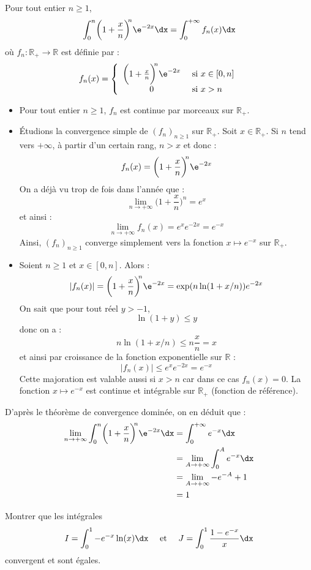 \documentclass[a4paper,10pt]{report}
\begin{document}
\corr Pour tout entier $n \geq 1$,
$$ \int_{0}^{n} \biggl( 1 + \frac{x}{n} \biggr)^{\!\!n} \e^{ - 2x} \dx = \int_0^{+ \infty} f_n(x) \dx$$
où $f_n : \mathbb{R}_+ \rightarrow  \mathbb{R}$ est définie par :
$$ f_n(x) = \left\lbrace \begin{array}{cl}
\biggl( 1 + \frac{x}{n} \biggr)^{\!\!n} \e^{ - 2x} & \hbox{ si } x \in [0,n] \\
0 & \hbox{ si } x>n
\end{array}\right.$$
\begin{itemize}
\item Pour tout entier $n \geq 1$, $f_n$ est continue par morceaux sur $\mathbb{R}_+$.
\item Étudions la convergence simple de $(f_n)_{n \geq 1}$ sur $\mathbb{R}_+$. Soit $x \in \mathbb{R}_+$. Si $n$ tend vers $+ \infty$, à partir d'un certain rang, $n>x$ et donc :
$$ f_n(x) = \biggl( 1 + \frac{x}{n} \biggr)^{\!\!n} \e^{ - 2x}$$
On a déjà vu trop de fois dans l'année que :
$$ \lim_{n \rightarrow + \infty} \biggl( 1 + \frac{x}{n} \biggr)^{\!\!n} = e^x$$
et ainsi :
$$ \lim_{n \rightarrow + \infty} f_n(x) =e^x e^{-2x} = e^{-x}$$
Ainsi, $(f_n)_{n \geq 1}$ converge simplement vers la fonction $x \mapsto e^{-x}$ sur $\mathbb{R}_+$.
\item Soient $n \geq 1$ et $x \in [0,n]$. Alors :
$$ \vert f_n(x) \vert = \biggl( 1 + \frac{x}{n} \biggr)^{\!\!n} \e^{ - 2x} = \exp(n \ln(1+x/n)) e^{-2x}$$
On sait que pour tout réel $y>-1$,
$$ \ln(1+y) \leq y$$
donc on a :
$$ n \ln(1+x/n) \leq n\dfrac{x}{n} = x$$
et ainsi par croissance de la fonction exponentielle sur $\mathbb{R}$ :
$$ \vert f_n(x) \vert  \leq e^{x} e^{-2x} = e^{-x}$$
Cette majoration est valable aussi si $x>n$ car dans ce cas $f_n(x)=0$. La fonction $x \mapsto e^{-x}$ est continue et intégrable sur $\mathbb{R}_+$ (fonction de référence).
\end{itemize}
D'après le théorème de convergence dominée, on en déduit que :
\begin{align*}
\lim_{n \to + \infty} \int_{0}^{n} \biggl( 1 + \frac{x}{n} \biggr)^{\!\!n} \e^{ - 2x} \dx & = \int_0^{+ \infty} e^{-x} \dx \\
& = \lim_{A \rightarrow + \infty} \int_0^A e^{-x} \dx \\
&  = \lim_{A \rightarrow + \infty} -e^{-A}+1 \\
& = 1
\end{align*}

\begin{Exa} Montrer que les intégrales 
$$ I=\int_{0}^1 -e^{-x} \ln(x) \dx \quad \hbox{ et } \quad J= \int_{0}^1 \frac{1-e^{-x}}{x} \dx$$
convergent et sont égales.
\end{Exa}
\end{document}
